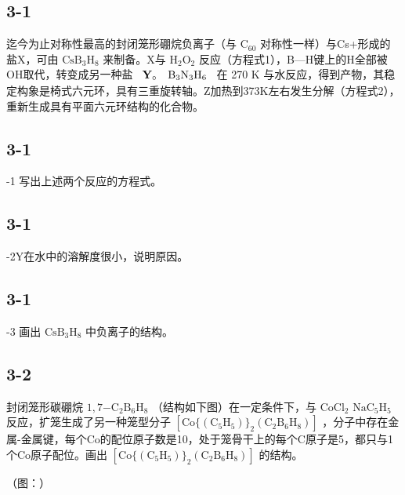 \subsection*{3-1}
迄今为⽌对称性最⾼的封闭笼形硼烷负离⼦（与 $\mathrm { C } _ { 6 0 }$ 对称性⼀样）与Cs+形成的盐X，可由 $\mathrm { C s B _ { 3 } H _ { 8 } }$ 来制备。X与 $\mathrm { H _ { 2 } O _ { 2 } }$ 反应（⽅程式1），B—H键上的H全部被OH取代，转变成另⼀种盐 $\begin{array} { r l } { \mathbf { Y } _ { \circ } } & { { } \mathrm { B } _ { 3 } \mathrm { N } _ { 3 } \mathrm { H } _ { 6 } } \end{array}$ 在 270 K 与⽔反应，得到产物，其稳定构象是椅式六元环，具有三重旋转轴。Z加热到373K左右发⽣分解（⽅程式2），重新⽣成具有平⾯六元环结构的化合物。

\subsection*{3-1}
-1 写出上述两个反应的⽅程式。

\subsection*{3-1}
-2Y在⽔中的溶解度很⼩，说明原因。

\subsection*{3-1}
-3 画出 $\mathrm { C s B _ { 3 } H _ { 8 } }$ 中负离⼦的结构。

\subsection*{3-2}
封闭笼形碳硼烷 $1 , 7 \mathrm { { - C _ { 2 } B _ { 6 } H _ { 8 } } }$ （结构如下图）在⼀定条件下，与 $\mathrm { C o C l _ { 2 } }$ $\mathrm { N a C _ { 5 } H _ { 5 } }$ 反应，扩笼⽣成了另⼀种笼型分⼦ $\mathrm { [ C o \{ ( C _ { 5 } H _ { 5 } ) \} _ { 2 } ( C _ { 2 } B _ { 6 } H _ { 8 } ) ] }$ ，分⼦中存在⾦属-⾦属键，每个Co的配位原⼦数是10，处于笼⻣⼲上的每个C原⼦是5，都只与1个Co原⼦配位。画出 $\mathrm { [ C o \{ ( C _ { 5 } H _ { 5 } ) \} _ { 2 } ( C _ { 2 } B _ { 6 } H _ { 8 } ) ] }$ 的结构。

（图：）
